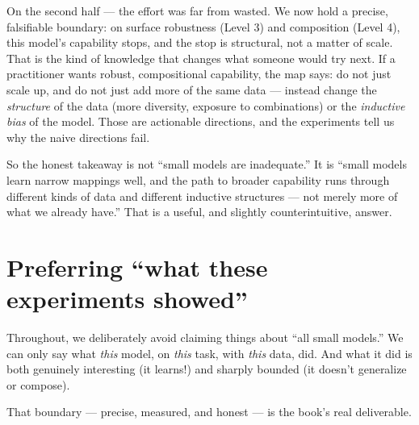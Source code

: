 On the second half --- the effort was far from wasted. We now hold a
precise, falsifiable boundary: on surface robustness (Level 3) and
composition (Level 4), this model's capability stops, and the stop is
structural, not a matter of scale. That is the kind of knowledge that
changes what someone would try next. If a practitioner wants robust,
compositional capability, the map says: do not just scale up, and do not
just add more of the same data --- instead change the \emph{structure}
of the data (more diversity, exposure to combinations) or the
\emph{inductive bias} of the model. Those are actionable directions, and
the experiments tell us why the naive directions fail.

So the honest takeaway is not ``small models are inadequate.'' It is
``small models learn narrow mappings well, and the path to broader
capability runs through different kinds of data and different inductive
structures --- not merely more of what we already have.'' That is a
useful, and slightly counterintuitive, answer.

\section{Preferring ``what these experiments
showed''}\label{preferring-what-these-experiments-showed}

Throughout, we deliberately avoid claiming things about ``all small
models.'' We can only say what \emph{this} model, on \emph{this} task,
with \emph{this} data, did. And what it did is both genuinely
interesting (it learns!) and sharply bounded (it doesn't generalize or
compose).

That boundary --- precise, measured, and honest --- is the book's real
deliverable.
